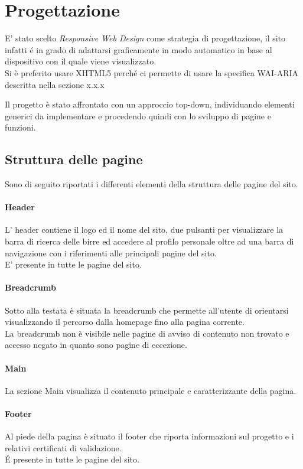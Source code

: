 \section{Progettazione}
E' stato scelto \textit{Responsive Web Design} come strategia di progettazione, il sito infatti é in grado di adattarsi graficamente in modo automatico in base al dispositivo con il quale viene visualizzato. \\
Si è preferito usare  XHTML5  perché  ci  permette  di  usare  la  specifica  WAI-ARIA descritta nella sezione x.x.x

Il progetto è stato affrontato con un approccio top-down, individuando elementi generici da implementare e procedendo quindi con lo sviluppo di pagine e funzioni.


\subsection{Struttura delle pagine}
Sono di seguito riportati i differenti elementi della struttura delle pagine del sito.
\paragraph{Header}
L' header contiene il logo ed il nome del sito, due pulsanti per visualizzare la barra di ricerca delle birre ed accedere al profilo personale oltre ad una barra di navigazione con i riferimenti alle principali pagine del sito.\\
E' presente in tutte le pagine del sito.
\paragraph{Breadcrumb}
Sotto alla testata è situata la breadcrumb che permette all'utente di orientarsi visualizzando il percorso dalla homepage fino alla pagina corrente.\\
La breadcrumb non è visibile nelle pagine di avviso di contenuto non trovato e accesso negato in quanto sono pagine di eccezione.
\paragraph{Main}
La sezione Main visualizza il contenuto principale e caratterizzante della pagina.
\paragraph{Footer}
Al piede della pagina è situato il footer che riporta informazioni sul progetto e i relativi certificati di validazione.\\
\'E presente in tutte le pagine del sito.

